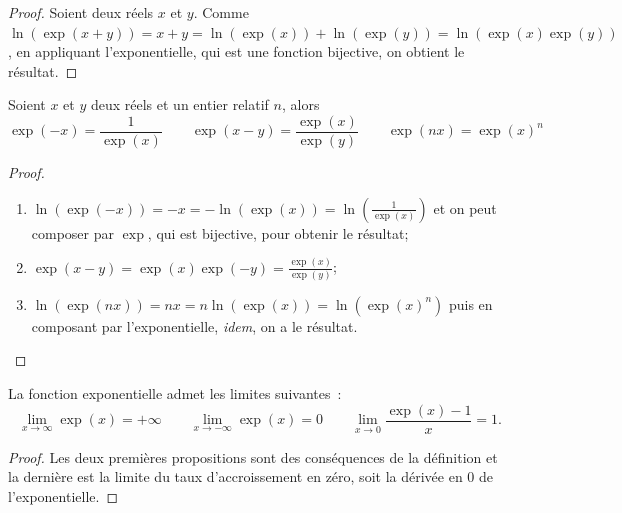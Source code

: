 \begin{proof}
    Soient deux réels \(x\) et \(y\). Comme \(\ln(\exp(x+y)) = x+y = 
    \ln(\exp(x))+\ln(\exp(y)) = \ln(\exp(x) \exp(y))\), en appliquant 
    l'exponentielle, qui est une fonction bijective, on obtient le résultat.
\end{proof}

\begin{cor}
    Soient \(x\) et \(y\) deux réels et un entier relatif \(n\), alors
    \begin{equation}
        \exp(-x) = \frac{1}{\exp(x)} \qquad \exp(x-y) = 
        \frac{\exp(x)}{\exp(y)} \qquad \exp(nx) = \exp(x)^n
    \end{equation}
\end{cor}

\begin{proof}
    \begin{enumerate}
        \item \(\ln(\exp(-x)) = -x = -\ln(\exp(x)) = \ln 
            \left(\frac{1}{\exp(x)}\right)\) et on peut composer par 
            \(\exp\), qui est bijective, pour obtenir le résultat;
        \item \(\exp(x-y) = \exp(x) \exp(-y) = \frac{\exp(x)}{\exp(y)}\);
        \item \(\ln(\exp(nx)) = nx = n \ln(\exp(x)) = \ln(\exp(x)^n)\) puis en 
            composant par l'exponentielle, \emph{idem}, on a le résultat.
    \end{enumerate}
\end{proof}

\begin{cor}
    La fonction exponentielle admet les limites suivantes~:
    \begin{equation}
        \lim\limits_{x \to \infty} \exp(x) = +\infty \qquad \lim\limits_{x \to 
        -\infty} \exp(x) = 0 \qquad \lim\limits_{x \to 0} \frac{\exp(x)-1}{x}
        = 1.
    \end{equation}
\end{cor}

\begin{proof}
    Les deux premières propositions sont des conséquences de la définition 
    et la dernière est la limite du taux d'accroissement en zéro, soit la 
    dérivée en 0 de l'exponentielle.
\end{proof}

